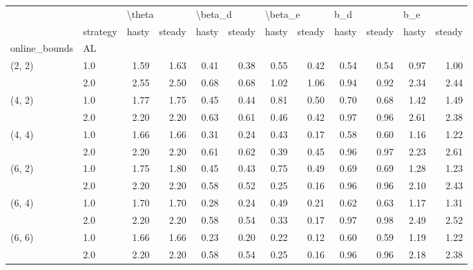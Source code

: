 \begin{tabular}{llrrrrrrrrrr}
\toprule
       & {} & \multicolumn{2}{l}{\textbackslash theta} & \multicolumn{2}{l}{\textbackslash beta\_d} & \multicolumn{2}{l}{\textbackslash beta\_e} & \multicolumn{2}{l}{b\_d} & \multicolumn{2}{l}{b\_e} \\
       & strategy &  hasty & steady &   hasty & steady &   hasty & steady & hasty & steady & hasty & steady \\
online\_bounds & AL &        &        &         &        &         &        &       &        &       &        \\
\midrule
(2, 2) & 1.0 &   1.59 &   1.63 &    0.41 &   0.38 &    0.55 &   0.42 &  0.54 &   0.54 &  0.97 &   1.00 \\
       & 2.0 &   2.55 &   2.50 &    0.68 &   0.68 &    1.02 &   1.06 &  0.94 &   0.92 &  2.34 &   2.44 \\
(4, 2) & 1.0 &   1.77 &   1.75 &    0.45 &   0.44 &    0.81 &   0.50 &  0.70 &   0.68 &  1.42 &   1.49 \\
       & 2.0 &   2.20 &   2.20 &    0.63 &   0.61 &    0.46 &   0.42 &  0.97 &   0.96 &  2.61 &   2.38 \\
(4, 4) & 1.0 &   1.66 &   1.66 &    0.31 &   0.24 &    0.43 &   0.17 &  0.58 &   0.60 &  1.16 &   1.22 \\
       & 2.0 &   2.20 &   2.20 &    0.61 &   0.62 &    0.39 &   0.45 &  0.96 &   0.97 &  2.23 &   2.61 \\
(6, 2) & 1.0 &   1.75 &   1.80 &    0.45 &   0.43 &    0.75 &   0.49 &  0.69 &   0.69 &  1.28 &   1.23 \\
       & 2.0 &   2.20 &   2.20 &    0.58 &   0.52 &    0.25 &   0.16 &  0.96 &   0.96 &  2.10 &   2.43 \\
(6, 4) & 1.0 &   1.70 &   1.70 &    0.28 &   0.24 &    0.49 &   0.21 &  0.62 &   0.63 &  1.17 &   1.31 \\
       & 2.0 &   2.20 &   2.20 &    0.58 &   0.54 &    0.33 &   0.17 &  0.97 &   0.98 &  2.49 &   2.52 \\
(6, 6) & 1.0 &   1.66 &   1.66 &    0.23 &   0.20 &    0.22 &   0.12 &  0.60 &   0.59 &  1.19 &   1.22 \\
       & 2.0 &   2.20 &   2.20 &    0.58 &   0.54 &    0.25 &   0.16 &  0.96 &   0.96 &  2.18 &   2.38 \\
\bottomrule
\end{tabular}
